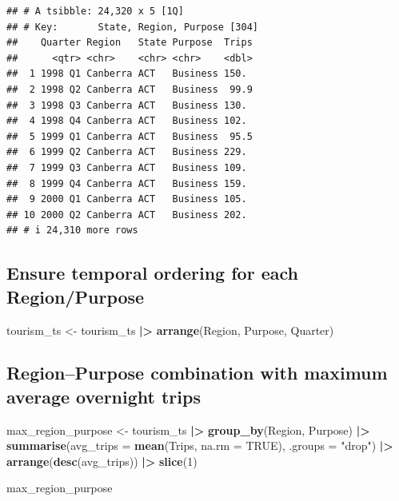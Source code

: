 \documentclass[
  11pt,
]{article}
\newenvironment{Shaded}{\begin{snugshade}}{\end{snugshade}}
\newcommand{\AttributeTok}[1]{\textcolor[rgb]{0.13,0.29,0.53}{#1}}
\newcommand{\ConstantTok}[1]{\textcolor[rgb]{0.56,0.35,0.01}{#1}}
\newcommand{\DecValTok}[1]{\textcolor[rgb]{0.00,0.00,0.81}{#1}}
\newcommand{\FunctionTok}[1]{\textcolor[rgb]{0.13,0.29,0.53}{\textbf{#1}}}
\newcommand{\NormalTok}[1]{#1}
\newcommand{\OtherTok}[1]{\textcolor[rgb]{0.56,0.35,0.01}{#1}}
\newcommand{\SpecialCharTok}[1]{\textcolor[rgb]{0.81,0.36,0.00}{\textbf{#1}}}
\newcommand{\StringTok}[1]{\textcolor[rgb]{0.31,0.60,0.02}{#1}}
\begin{document}
\begin{verbatim}
## # A tsibble: 24,320 x 5 [1Q]
## # Key:       State, Region, Purpose [304]
##    Quarter Region   State Purpose  Trips
##      <qtr> <chr>    <chr> <chr>    <dbl>
##  1 1998 Q1 Canberra ACT   Business 150. 
##  2 1998 Q2 Canberra ACT   Business  99.9
##  3 1998 Q3 Canberra ACT   Business 130. 
##  4 1998 Q4 Canberra ACT   Business 102. 
##  5 1999 Q1 Canberra ACT   Business  95.5
##  6 1999 Q2 Canberra ACT   Business 229. 
##  7 1999 Q3 Canberra ACT   Business 109. 
##  8 1999 Q4 Canberra ACT   Business 159. 
##  9 2000 Q1 Canberra ACT   Business 105. 
## 10 2000 Q2 Canberra ACT   Business 202. 
## # i 24,310 more rows
\end{verbatim}

\subsection{Ensure temporal ordering for each
Region/Purpose}\label{ensure-temporal-ordering-for-each-regionpurpose}

\begin{Shaded}
\begin{Highlighting}[]
\NormalTok{tourism\_ts }\OtherTok{\textless{}{-}}\NormalTok{ tourism\_ts }\SpecialCharTok{|\textgreater{}}
  \FunctionTok{arrange}\NormalTok{(Region, Purpose, Quarter)}
\end{Highlighting}
\end{Shaded}

\subsection{Region--Purpose combination with maximum average overnight
trips}\label{regionpurpose-combination-with-maximum-average-overnight-trips}

\begin{Shaded}
\begin{Highlighting}[]
\NormalTok{max\_region\_purpose }\OtherTok{\textless{}{-}}\NormalTok{ tourism\_ts }\SpecialCharTok{|\textgreater{}}
  \FunctionTok{group\_by}\NormalTok{(Region, Purpose) }\SpecialCharTok{|\textgreater{}}
  \FunctionTok{summarise}\NormalTok{(}\AttributeTok{avg\_trips =} \FunctionTok{mean}\NormalTok{(Trips, }\AttributeTok{na.rm =} \ConstantTok{TRUE}\NormalTok{), }\AttributeTok{.groups =} \StringTok{"drop"}\NormalTok{) }\SpecialCharTok{|\textgreater{}}
  \FunctionTok{arrange}\NormalTok{(}\FunctionTok{desc}\NormalTok{(avg\_trips)) }\SpecialCharTok{|\textgreater{}}
  \FunctionTok{slice}\NormalTok{(}\DecValTok{1}\NormalTok{)}

\NormalTok{max\_region\_purpose}
\end{Highlighting}
\end{Shaded}
\end{document}
